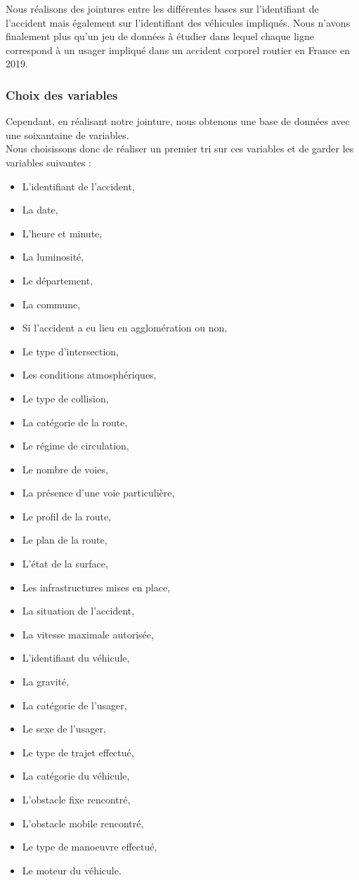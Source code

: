\documentclass[french,]{tp}
\providecommand{\tightlist}{%
  \setlength{\itemsep}{0pt}\setlength{\parskip}{0pt}}
\begin{document}
Nous réalisons des jointures entre les différentes bases sur l'identifiant de l'accident mais également sur l'identifiant des véhicules impliqués. Nous n'avons finalement plus qu'un jeu de données à étudier dans lequel chaque ligne correspond à un usager impliqué dans un accident corporel routier en France en 2019.

\hypertarget{choix-des-variables}{%
\subsubsection{Choix des variables}\label{choix-des-variables}}

Cependant, en réalisant notre jointure, nous obtenons une base de données avec une soixantaine de variables.\\
Nous choisissons donc de réaliser un premier tri sur ces variables et de garder les variables suivantes :

\begin{itemize}
\tightlist
\item
  L'identifiant de l'accident,
\item
  La date,
\item
  L'heure et minute,
\item
  La luminosité,
\item
  Le département,
\item
  La commune,
\item
  Si l'accident a eu lieu en agglomération ou non,
\item
  Le type d'intersection,
\item
  Les conditions atmosphériques,
\item
  Le type de collision,
\item
  La catégorie de la route,
\item
  Le régime de circulation,
\item
  Le nombre de voies,
\item
  La présence d'une voie particulière,
\item
  Le profil de la route,
\item
  Le plan de la route,
\item
  L'état de la surface,
\item
  Les infrastructures mises en place,
\item
  La situation de l'accident,
\item
  La vitesse maximale autorisée,
\item
  L'identifiant du véhicule,
\item
  La gravité,
\item
  La catégorie de l'usager,
\item
  Le sexe de l'usager,
\item
  Le type de trajet effectué,
\item
  La catégorie du véhicule,
\item
  L'obstacle fixe rencontré,
\item
  L'obstacle mobile rencontré,
\item
  Le type de manoeuvre effectué,
\item
  Le moteur du véhicule.
\end{itemize}
\end{document}
